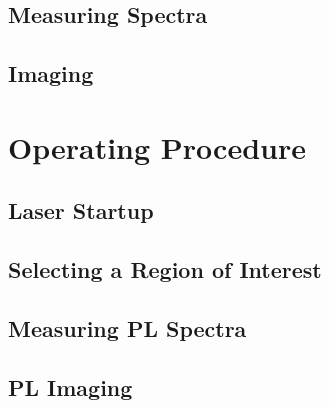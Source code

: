 \subsection{Measuring Spectra}
\subsection{Imaging}

\section{Operating Procedure}
\subsection{Laser Startup} %
\subsection{Selecting a Region of Interest}
\subsection{Measuring PL Spectra}
\subsection{PL Imaging}